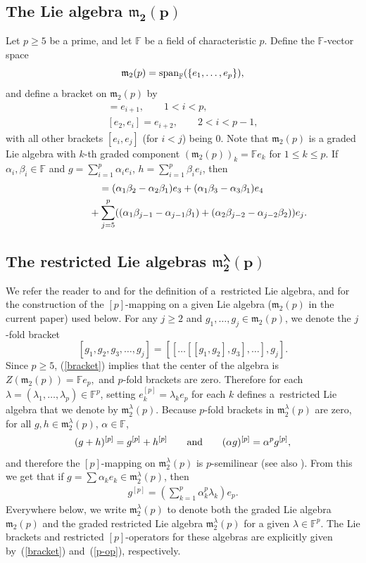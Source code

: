 \documentclass[pdftex]{sigma}
\def\spn{\mathop{\rm span}}
\def\m{\mathfrak m}
\def\F{\mathbb F}
\numberwithin{equation}{section}
\begin{document}
\subsection[The Lie algebra $\m_2(p)$]{The Lie algebra $\boldsymbol{\m_2(p)}$}\label{section2.1}

Let $p\ge 5$ be a prime, and let $\F$ be a field of characteristic
$p$. Define the $\F$-vector space
\[\m_2(p)=\spn\nolimits_\F(\{e_1,\dots , e_p\}), \]
and define a bracket on $\m_2(p)$ by \
\begin{gather*}
 [e_1,e_i] =e_{i+1},\qquad 1<i < p,\\
 [e_2,e_i] =e_{i+2},\qquad 2<i < p-1,
\end{gather*}
with all other brackets $[e_i,e_j]$ (for $i<j$) being $0$. Note that
$\m_2(p)$ is a graded Lie algebra with $k$-th graded component
$(\m_2(p))_k=\F e_k$ for $1\le k\le p$. If $\alpha_i, \beta_i \in \F$
and $g=\sum_{i=1}^p \alpha_ie_i$, $h=\sum_{i=1}^p \beta_ie_i$, then
\begin{gather} [g,h] =(\alpha_1\beta_2-\alpha_2\beta_1)e_3+(\alpha_1\beta_3-\alpha_3\beta_1)e_4 \nonumber\\
\hphantom{[g,h] =}{} +\sum_{j=5}^p ((\alpha_1\beta_{j-1}-\alpha_{j-1}\beta_1)+(\alpha_2\beta_{j-2}-\alpha_{j-2}\beta_2)) e_j.\label{bracket}
\end{gather}

\subsection[The restricted Lie algebras $\m_2^\lambda(p)$]{The restricted Lie algebras $\boldsymbol{\m_2^\lambda(p)}$}

We refer the reader to \cite[Chapter~V, Section~7]{JacobsonBook} and \cite[Section~2.2]{SF} for the definition of a~restricted Lie algebra,
and for the construction of the $[p]$-mapping on a given Lie algebra
($\m_2(p)$ in the current paper) used below. For any $j\ge 2$ and
$g_1,\dots, g_j\in\m_2(p)$, we denote the $j$-fold bracket
\[[g_1,g_2,g_3,\dots, g_j]=[[\dots[[g_1,g_2],g_3],\dots],g_j].\] Since
$p\ge 5$, (\ref{bracket}) implies that the center of the algebra is
$Z(\m_2(p))= \F e_p,$ and $p$-fold brackets are zero. Therefore for
each $\lambda=(\lambda_1, \dots , \lambda_p)\in\F^p$, setting
$e_k^{[p]}=\lambda_k e_p$ for each $k$ defines a~restricted Lie
algebra that we denote by $\m_2^\lambda(p)$. Because $p$-fold
brackets in $\m_2^\lambda(p)$ are zero, for all
$g,h\in\m_2^\lambda(p)$, $\alpha\in\F$,
\[(g+h)^{[p]}=g^{[p]}+h^{[p]}\qquad {\rm and}\qquad (\alpha g)^{[p]}=\alpha^p g^{[p]},\] and therefore the $[p]$-mapping on
$\m_2^\lambda(p)$ is $p$-semilinear (see also \cite[Chapter~2, Lemma~1.2]{SF}). From this we get that if
$g=\sum \alpha_k e_k\in\m_2^\lambda(p)$, then
\begin{eqnarray}\label{p-op} g^{[p]}=\left (\sum_{k=1}^p \alpha_k^p\lambda_k \right ) e_p.
\end{eqnarray}
Everywhere below, we write $\m_2^\lambda(p)$ to denote both the graded
Lie algebra $\m_2(p)$ and the graded restricted Lie algebra
$\m_2^\lambda(p)$ for a given $\lambda\in\F^p$. The Lie brackets and
restricted $[p]$-operators for these algebras are explicitly given by~(\ref{bracket}) and~(\ref{p-op}), respectively.
\end{document}

